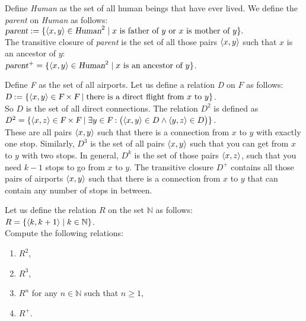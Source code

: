 \example
Define  \textsl{Human} as the set of all human beings that have ever lived.
We define the \textsl{parent} on \textsl{Human} as follows:
\\[0.2cm]
\hspace*{1.3cm}
$\textsl{parent} := \{ \pair(x,y) \in \textsl{Human}^2 \mid \mbox{$x$ is father of $y$ or
                                                                  $x$ is mother of $y$} \}.$
\\[0.2cm]
The transitive closure of  \textsl{parent} is the set of all those pairs
$\pair(x,y)$ such that $x$ is an ancestor of $y$:
\\[0.2cm]
\hspace*{1.3cm}
$\textsl{parent}^+ = \{ \pair(x,y) \in \textsl{Human}^2 \mid \mbox{$x$ is an ancestor of $y$} \}$.
\next

\example
Define \textsl{F} as the set of all airports.  Let us define a 
relation \textsl{D} on $F$ as follows:
\\[0.2cm]
\hspace*{1.3cm}
$\textsl{D} := \{ \pair(x,y) \in \textsl{F} \times \textsl{F} \mid
                  \mbox{there is a direct flight from $x$ to $y$} \}$.
\\[0.2cm]
So $D$ is the set of all direct connections.  The relation $D^2$ is defined as
\\[0.2cm]
\hspace*{1.3cm}
$D^2 = \{ \pair(x,z) \in \textsl{F} \times \textsl{F} \mid 
          \exists y \in \textsl{F}: \bigl(\pair(x,y) \in D \wedge \pair(y,z) \in D\bigr) \}$.
\\[0.2cm]
These are all pairs $\pair(x,y)$ such that there is a connection from $x$ to $y$ with
exactly one stop.
Similarly, $D^3$ is the set of all pairs $\pair(x,y)$ such that you can get from $x$ to
$y$ with two stops.  In general, $D^k$ is the set of those pairs $\pair(x,z)$, 
such that you need  $k-1$ stops to go from $x$ to $y$.
The transitive closure $D^+$ contains all those pairs of airports $\pair(x,y)$ such that 
there is a connection from $x$ to $y$ that can contain any number of stops in between.


\exercise
Let us define the relation $R$ on the set $\mathbb{N}$ as follows:
\\[0.2cm]
\hspace*{1.3cm}
$R = \{ \pair(k, k + 1) \mid k \in \mathbb{N} \}$.
\\[0.2cm]
Compute the following relations:
\begin{enumerate}
\item $R^2$,
\item $R^3$,
\item $R^n$ for any $n \in \mathbb{N}$ such that $n \geq 1$,
\item $R^+$.
\end{enumerate}


